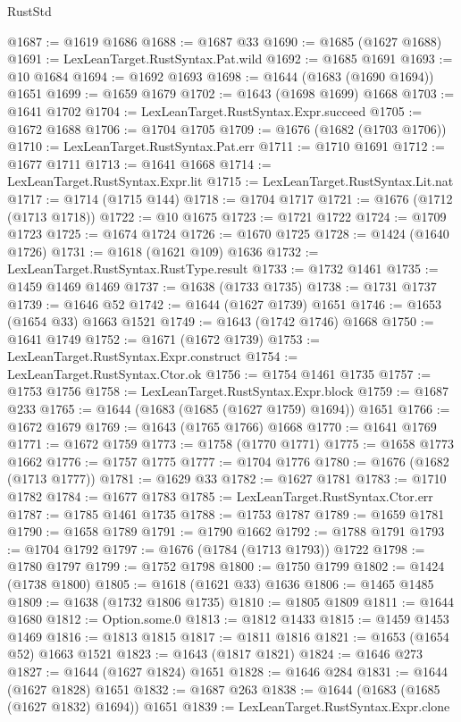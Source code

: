 \begin{lexlean}{RustStd}
\begin{coremodule}
@1687 := @1619 @1686
@1688 := @1687 @33
@1690 := @1685 (@1627 @1688)
@1691 := LexLeanTarget.RustSyntax.Pat.wild
@1692 := @1685 @1691
@1693 := @10 @1684
@1694 := @1692 @1693
@1698 := @1644 (@1683 (@1690 @1694)) @1651
@1699 := @1659 @1679
@1702 := @1643 (@1698 @1699) @1668
@1703 := @1641 @1702
@1704 := LexLeanTarget.RustSyntax.Expr.succeed
@1705 := @1672 @1688
@1706 := @1704 @1705
@1709 := @1676 (@1682 (@1703 @1706))
@1710 := LexLeanTarget.RustSyntax.Pat.err
@1711 := @1710 @1691
@1712 := @1677 @1711
@1713 := @1641 @1668
@1714 := LexLeanTarget.RustSyntax.Expr.lit
@1715 := LexLeanTarget.RustSyntax.Lit.nat
@1717 := @1714 (@1715 @144)
@1718 := @1704 @1717
@1721 := @1676 (@1712 (@1713 @1718))
@1722 := @10 @1675
@1723 := @1721 @1722
@1724 := @1709 @1723
@1725 := @1674 @1724
@1726 := @1670 @1725
@1728 := @1424 (@1640 @1726)
@1731 := @1618 (@1621 @109) @1636
@1732 := LexLeanTarget.RustSyntax.RustType.result
@1733 := @1732 @1461
@1735 := @1459 @1469 @1469
@1737 := @1638 (@1733 @1735)
@1738 := @1731 @1737
@1739 := @1646 @52
@1742 := @1644 (@1627 @1739) @1651
@1746 := @1653 (@1654 @33) @1663 @1521
@1749 := @1643 (@1742 @1746) @1668
@1750 := @1641 @1749
@1752 := @1671 (@1672 @1739)
@1753 := LexLeanTarget.RustSyntax.Expr.construct
@1754 := LexLeanTarget.RustSyntax.Ctor.ok
@1756 := @1754 @1461 @1735
@1757 := @1753 @1756
@1758 := LexLeanTarget.RustSyntax.Expr.block
@1759 := @1687 @233
@1765 := @1644 (@1683 (@1685 (@1627 @1759) @1694)) @1651
@1766 := @1672 @1679
@1769 := @1643 (@1765 @1766) @1668
@1770 := @1641 @1769
@1771 := @1672 @1759
@1773 := @1758 (@1770 @1771)
@1775 := @1658 @1773 @1662
@1776 := @1757 @1775
@1777 := @1704 @1776
@1780 := @1676 (@1682 (@1713 @1777))
@1781 := @1629 @33
@1782 := @1627 @1781
@1783 := @1710 @1782
@1784 := @1677 @1783
@1785 := LexLeanTarget.RustSyntax.Ctor.err
@1787 := @1785 @1461 @1735
@1788 := @1753 @1787
@1789 := @1659 @1781
@1790 := @1658 @1789
@1791 := @1790 @1662
@1792 := @1788 @1791
@1793 := @1704 @1792
@1797 := @1676 (@1784 (@1713 @1793)) @1722
@1798 := @1780 @1797
@1799 := @1752 @1798
@1800 := @1750 @1799
@1802 := @1424 (@1738 @1800)
@1805 := @1618 (@1621 @33) @1636
@1806 := @1465 @1485
@1809 := @1638 (@1732 @1806 @1735)
@1810 := @1805 @1809
@1811 := @1644 @1680
@1812 := Option.some.{0}
@1813 := @1812 @1433
@1815 := @1459 @1453 @1469
@1816 := @1813 @1815
@1817 := @1811 @1816
@1821 := @1653 (@1654 @52) @1663 @1521
@1823 := @1643 (@1817 @1821)
@1824 := @1646 @273
@1827 := @1644 (@1627 @1824) @1651
@1828 := @1646 @284
@1831 := @1644 (@1627 @1828) @1651
@1832 := @1687 @263
@1838 := @1644 (@1683 (@1685 (@1627 @1832) @1694)) @1651
@1839 := LexLeanTarget.RustSyntax.Expr.clone

\end{coremodule}
\end{lexlean}
